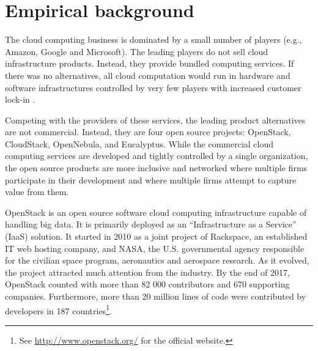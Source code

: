 \documentclass[dvipsnames]{bmcart}
\theoremstyle{definition}
\begin{document}
\section{Empirical background}


The cloud computing business is dominated by a small number of players (e.g., Amazon, Google and Microsoft). The leading players do not sell cloud infrastructure products. Instead, they provide bundled computing services. If there was no alternatives, all cloud computation would run in hardware and software infrastructures controlled by very few players with increased customer lock-in \cite{teixeira2015lessons}. 

Competing with the providers of these services, the leading product alternatives are not commercial. Instead, they are four open source projects: OpenStack, CloudStack, OpenNebula, and Eucalyptus. While the commercial cloud computing services are developed and tightly controlled by a single organization, the open source products are more inclusive and networked where multiple firms participate in their development and where multiple firms attempt to capture value from them.

OpenStack is an open source software cloud computing infrastructure capable of handling big data. It is primarily deployed as an ``Infrastructure as a Service'' (IaaS) solution.  It started in 2010 
as a joint project of Rackspace, an established IT web hosting company, and NASA, the U.S. governmental agency responsible for the civilian space program, aeronautics and aerospace research.  As it evolved,  the project attracted much attention from the industry. 
By the end of 2017, OpenStack counted with more than 82 000 contributors and 670 supporting companies. Furthermore, more than 20 million lines of code were contributed by developers in 187 countries\footnote{See \url{http://www.openstack.org/} for the official website.}. 
\end{document}
